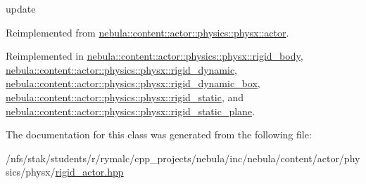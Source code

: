 update 

Reimplemented from \hyperlink{classnebula_1_1content_1_1actor_1_1physics_1_1physx_1_1actor_a16da3f8769e927a8fe9ae353aa8411af}{nebula::content::actor::physics::physx::actor}.

Reimplemented in \hyperlink{classnebula_1_1content_1_1actor_1_1physics_1_1physx_1_1rigid__body_a4bd2572632f4e23314db0857e52b079c}{nebula::content::actor::physics::physx::rigid\_\-body}, \hyperlink{classnebula_1_1content_1_1actor_1_1physics_1_1physx_1_1rigid__dynamic_a4687fa4b706a0adf0b733ff199bd0d25}{nebula::content::actor::physics::physx::rigid\_\-dynamic}, \hyperlink{classnebula_1_1content_1_1actor_1_1physics_1_1physx_1_1rigid__dynamic__box_af0b2a118a005904df613fa771c55da93}{nebula::content::actor::physics::physx::rigid\_\-dynamic\_\-box}, \hyperlink{classnebula_1_1content_1_1actor_1_1physics_1_1physx_1_1rigid__static_ada05e897e2f4dd915f525893fc027f39}{nebula::content::actor::physics::physx::rigid\_\-static}, and \hyperlink{classnebula_1_1content_1_1actor_1_1physics_1_1physx_1_1rigid__static__plane_a1f3ad3d71a0828a841901a7e69cbbe97}{nebula::content::actor::physics::physx::rigid\_\-static\_\-plane}.

The documentation for this class was generated from the following file:\begin{DoxyCompactItemize}
\item 
/nfs/stak/students/r/rymalc/cpp\_\-projects/nebula/inc/nebula/content/actor/physics/physx/\hyperlink{physics_2physx_2rigid__actor_8hpp}{rigid\_\-actor.hpp}\end{DoxyCompactItemize}
